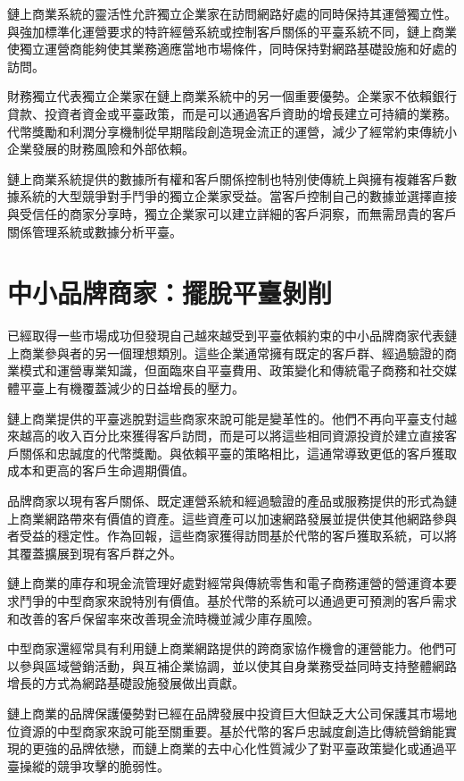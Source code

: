 \documentclass[
  Letterpaper,
]{scrbook}
\begin{document}
鏈上商業系統的靈活性允許獨立企業家在訪問網路好處的同時保持其運營獨立性。與強加標準化運營要求的特許經營系統或控制客戶關係的平臺系統不同，鏈上商業使獨立運營商能夠使其業務適應當地市場條件，同時保持對網路基礎設施和好處的訪問。

財務獨立代表獨立企業家在鏈上商業系統中的另一個重要優勢。企業家不依賴銀行貸款、投資者資金或平臺政策，而是可以通過客戶資助的增長建立可持續的業務。代幣獎勵和利潤分享機制從早期階段創造現金流正的運營，減少了經常約束傳統小企業發展的財務風險和外部依賴。

鏈上商業系統提供的數據所有權和客戶關係控制也特別使傳統上與擁有複雜客戶數據系統的大型競爭對手鬥爭的獨立企業家受益。當客戶控制自己的數據並選擇直接與受信任的商家分享時，獨立企業家可以建立詳細的客戶洞察，而無需昂貴的客戶關係管理系統或數據分析平臺。

\section{中小品牌商家：擺脫平臺剝削}\label{ux4e2dux5c0fux54c1ux724cux5546ux5bb6ux64faux812bux5e73ux81faux525dux524a}

已經取得一些市場成功但發現自己越來越受到平臺依賴約束的中小品牌商家代表鏈上商業參與者的另一個理想類別。這些企業通常擁有既定的客戶群、經過驗證的商業模式和運營專業知識，但面臨來自平臺費用、政策變化和傳統電子商務和社交媒體平臺上有機覆蓋減少的日益增長的壓力。

鏈上商業提供的平臺逃脫對這些商家來說可能是變革性的。他們不再向平臺支付越來越高的收入百分比來獲得客戶訪問，而是可以將這些相同資源投資於建立直接客戶關係和忠誠度的代幣獎勵。與依賴平臺的策略相比，這通常導致更低的客戶獲取成本和更高的客戶生命週期價值。

品牌商家以現有客戶關係、既定運營系統和經過驗證的產品或服務提供的形式為鏈上商業網路帶來有價值的資產。這些資產可以加速網路發展並提供使其他網路參與者受益的穩定性。作為回報，這些商家獲得訪問基於代幣的客戶獲取系統，可以將其覆蓋擴展到現有客戶群之外。

鏈上商業的庫存和現金流管理好處對經常與傳統零售和電子商務運營的營運資本要求鬥爭的中型商家來說特別有價值。基於代幣的系統可以通過更可預測的客戶需求和改善的客戶保留率來改善現金流時機並減少庫存風險。

中型商家還經常具有利用鏈上商業網路提供的跨商家協作機會的運營能力。他們可以參與區域營銷活動，與互補企業協調，並以使其自身業務受益同時支持整體網路增長的方式為網路基礎設施發展做出貢獻。

鏈上商業的品牌保護優勢對已經在品牌發展中投資巨大但缺乏大公司保護其市場地位資源的中型商家來說可能至關重要。基於代幣的客戶忠誠度創造比傳統營銷能實現的更強的品牌依戀，而鏈上商業的去中心化性質減少了對平臺政策變化或通過平臺操縱的競爭攻擊的脆弱性。
\end{document}
